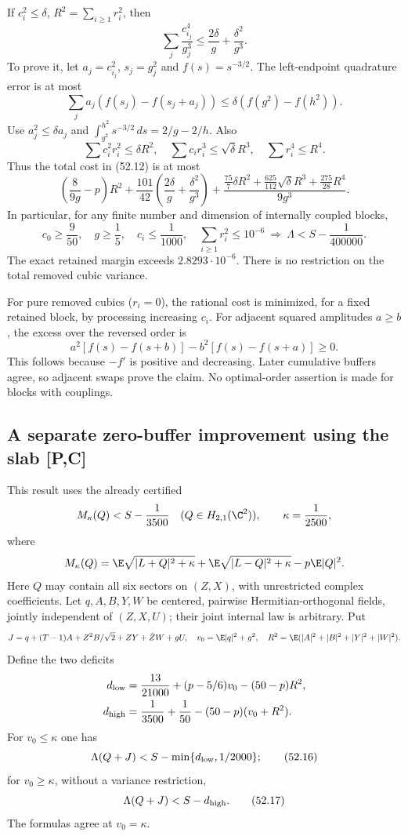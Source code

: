 If \(c_i^2\le\delta\), \(R^2=\sum_{i\ge1}r_i^2\), then
\[
 \sum_j\frac{c_{i_j}^4}{g_j^3}\le\frac{2\delta}{g}+
                                             \frac{\delta^2}{g^3}.
 \tag{52.13}
\]
To prove it, let \(a_j=c_{i_j}^2\), \(s_j=g_j^2\) and
\(f(s)=s^{-3/2}\). The left-endpoint quadrature error is at most
\[
 \sum_j a_j(f(s_j)-f(s_j+a_j))
 \le\delta(f(g^2)-f(h^2)).
\]
Use \(a_j^2\le\delta a_j\) and
\(\int_{g^2}^{h^2}s^{-3/2}\,ds=2/g-2/h\).
Also
\[
 \sum c_i^2r_i^2\le\delta R^2,\quad
 \sum c_ir_i^3\le\sqrt\delta R^3,\quad
 \sum r_i^4\le R^4.
\]
Thus the total cost in (52.12) is at most
\[
 \left(\frac8{9g}-p\right)R^2+
 \frac{101}{42}\left(\frac{2\delta}{g}+\frac{\delta^2}{g^3}\right)
 +\frac{\frac{75}{7}\delta R^2+
        \frac{625}{112}\sqrt\delta R^3+\frac{275}{28}R^4}{9g^3}.
 \tag{52.14}
\]
In particular, for any finite number and dimension of internally
coupled blocks,
\[
 \boxed{c_0\ge\frac9{50},\quad g\ge\frac15,\quad
 c_i\le\frac1{1000},\quad\sum_{i\ge1}r_i^2\le10^{-6}
 \ \Longrightarrow\ \Lambda<S-\frac1{400000}.}
 \tag{52.15}
\]
The exact retained margin exceeds \(2.8293\cdot10^{-6}\).
There is no restriction on the total removed cubic variance.

For pure removed cubics (\(r_i=0\)), the rational cost is minimized,
for a fixed retained block, by processing increasing \(c_i\).
For adjacent squared amplitudes \(a\ge b\), the excess over the
reversed order is
\[
 a^2[f(s)-f(s+b)]-b^2[f(s)-f(s+a)]\ge0.
\]
This follows because \(-f'\) is positive and decreasing. Later
cumulative buffers agree, so adjacent swaps prove the claim.
No optimal-order assertion is made for blocks with couplings.

\subsection{A separate zero-buffer improvement using the slab [P,C]}
This result uses the already certified
\[
 M_\kappa(Q)<S-\frac1{3500}\quad
 (Q\in H_{2,1}(\C^2)),\qquad\kappa=\frac1{2500},
\]
where
\[
 M_\kappa(Q)=\E\sqrt{|L+Q|^2+\kappa}
            +\E\sqrt{|L-Q|^2+\kappa}-p\E|Q|^2.
\]
Here \(Q\) may contain all six sectors on \((Z,X)\), with unrestricted
complex coefficients.
Let \(q,A,B,Y,W\) be centered, pairwise Hermitian-orthogonal fields,
jointly independent of \((Z,X,U)\); their joint internal law is arbitrary.
Put
\[
 J=q+(T-1)A+Z^2B/\sqrt2+ZY+\bar ZW+gU,\quad
 v_0=\E|q|^2+g^2,\quad
 R^2=\E(|A|^2+|B|^2+|Y|^2+|W|^2).
\]
Define the two deficits
\begin{align*}
 d_{\rm low}&=\frac{13}{21000}+(p-5/6)v_0-(50-p)R^2,\\
 d_{\rm high}&=\frac1{3500}+\frac1{50}-(50-p)(v_0+R^2).
\end{align*}
For \(v_0\le\kappa\) one has
\[
 \Lambda(Q+J)<S-\min\{d_{\rm low},1/2000\};
 \tag{52.16}
\]
for \(v_0\ge\kappa\), without a variance restriction,
\[
 \Lambda(Q+J)<S-d_{\rm high}.
 \tag{52.17}
\]
The formulas agree at \(v_0=\kappa\).

